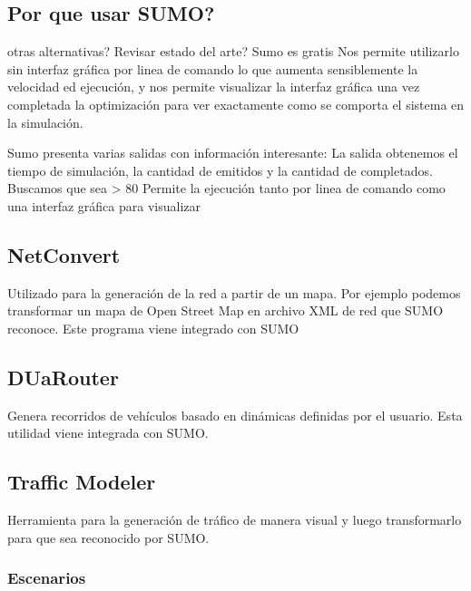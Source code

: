 \subsection{Por que usar SUMO? }
otras alternativas? Revisar estado del arte?
Sumo es gratis
Nos permite utilizarlo sin interfaz gráfica por linea de comando lo que aumenta sensiblemente la velocidad ed ejecución, y  nos permite visualizar la interfaz gráfica una vez completada la optimización para ver exactamente como se comporta el sistema en la simulación.

Sumo presenta varias salidas con información interesante: \citep{SUMOOUT} 
La salida obtenemos el tiempo de simulación, la cantidad de emitidos y la cantidad de completados. Buscamos que sea > 80%
Permite la ejecución tanto por linea de comando como una interfaz gráfica para visualizar

\subsection{NetConvert}
Utilizado para la generación de la red a partir de un mapa. Por ejemplo podemos transformar un mapa de Open Street Map en archivo XML de red que SUMO reconoce. Este programa viene integrado con SUMO

\subsection{DUaRouter}
 Genera recorridos de vehículos basado en dinámicas definidas por el usuario. Esta utilidad viene integrada con SUMO.

\subsection{Traffic Modeler}
Herramienta para la generación de tráfico de manera visual y luego transformarlo para que sea reconocido por SUMO. \citep{TrafficModeler}

\subsubsection{Escenarios}



